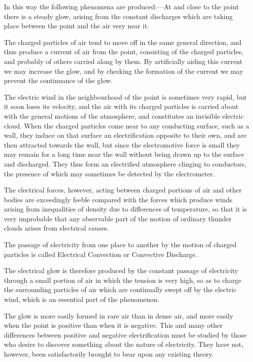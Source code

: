 \documentclass[11pt,a4paper]{article}
\begin{document}
In this way the following phenomena are produced:---At and
close to the point there is a steady glow, arising from the constant
discharges which are taking place between the point and the
air very near it.

The charged particles of air tend to move off in the same general
direction, and thus produce a current of air from the point,
consisting of the charged particles, and probably of others carried along
by them. By artificially aiding this current we may increase the
glow, and by checking the formation of the current we may
prevent the continuance of the glow.

\clearpage
\setcounter{footnote}{0}

The electric wind in the neighbourhood of the point is sometimes
very rapid, but it soon loses its velocity, and the air with its charged
particles is carried about with the general motions of the atmosphere,
and constitutes an invisible electric cloud. When the charged
particles come near to any conducting surface, such as a wall, they
induce on that surface an electrification opposite to their own, and
are then attracted towards the wall, but since the electromotive
force is small they may remain for a long time near the wall
without being drawn up to the surface and discharged. They
thus form an electrified atmosphere clinging to conductors, the
presence of which may sometimes be detected by the electrometer.

The electrical forces, however, acting between charged portions
of air and other bodies are exceedingly feeble compared with the
forces which produce winds arising from inequalities of density
due to differences of temperature, so that it is very improbable
that any observable part of the motion of ordinary thunder clouds
arises from electrical causes.

The passage of electricity from one place to another by the
motion of charged particles is called Electrical Convection or
Convective Discharge.

The electrical glow is therefore produced by the constant passage
of electricity through a small portion of air in which the tension
is very high, so as to charge the surrounding particles of air which
are continually swept off by the electric wind, which is an essential
part of the phenomenon.

The glow is more easily formed in rare air than in dense air,
and more easily when the point is positive than when it is negative.
This and many other differences between positive and negative
electrification must be studied by those who desire to discover
something about the nature of electricity. They have not, however,
been satisfactorily brought to bear upon any existing theory.
\end{document}
